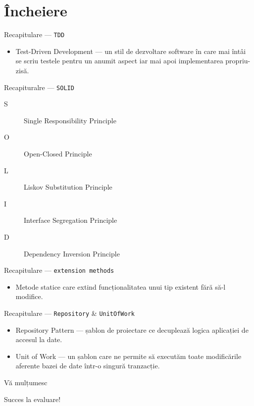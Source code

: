 \documentclass[presentation]{beamer}
\begin{document}
\section{Încheiere}
\label{sec:org3c2490c}
\begin{frame}[label={sec:org7f48693},fragile]{Recapitulare --- \texttt{TDD}}
 \begin{itemize}
\item \alert{Test-Driven Development} --- un stil de dezvoltare software în care mai întâi se scriu testele pentru un anumit aspect iar mai apoi implementarea propriu-zisă.
\end{itemize}
\end{frame}
\begin{frame}[label={sec:org2d9e188},fragile]{Recapituralre --- \texttt{SOLID}}
 \begin{description}
\item[{S}] Single Responsibility Principle
\item[{O}] Open-Closed Principle
\item[{L}] Liskov Substitution Principle
\item[{I}] Interface Segregation Principle
\item[{D}] Dependency Inversion Principle
\end{description}
\end{frame}
\begin{frame}[label={sec:org4171031},fragile]{Recapitulare --- \texttt{extension methods}}
 \begin{itemize}
\item Metode statice care extind funcționalitatea unui tip existent fără să-l modifice.
\end{itemize}
\end{frame}
\begin{frame}[label={sec:org6d79396},fragile]{Recapitulare --- \texttt{Repository} \& \texttt{UnitOfWork}}
 \begin{itemize}
\item \alert{Repository Pattern} --- șablon de proiectare ce decuplează logica aplicației de accesul la date.
\item \alert{Unit of Work} --- un șablon care ne permite să executăm toate modificările aferente bazei de date într-o singură tranzacție.
\end{itemize}
\end{frame}
\begin{frame}[label={sec:org351c364}]{Vă mulțumesc}
\begin{center}
Succes la evaluare!
\end{center}
\end{frame}
\end{document}
